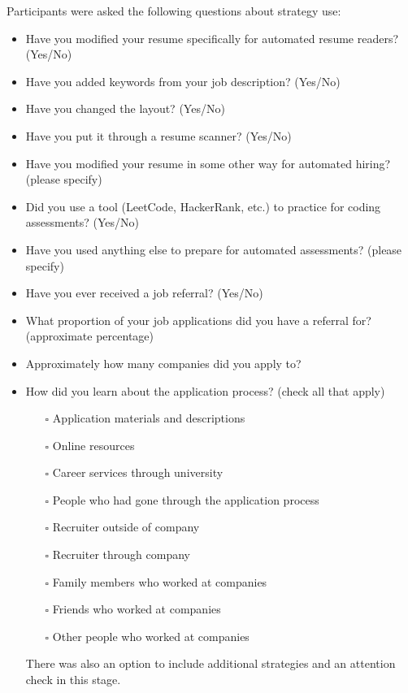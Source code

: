 Participants were asked the following questions about strategy use:
\begin{itemize}
\item Have you modified your resume specifically for automated resume readers? (Yes/No)
\item Have you added keywords from your job description? (Yes/No)
\item Have you changed the layout? (Yes/No)
\item Have you put it through a resume scanner? (Yes/No)
\item Have you modified your resume in some other way for automated hiring? (please specify)
\item Did you use a tool (LeetCode, HackerRank, etc.) to practice for coding assessments? (Yes/No)
\item Have you used anything else to prepare for automated assessments? (please specify)
\item Have you ever received a job referral? (Yes/No)
\item What proportion of your job applications did you have a referral for? (approximate percentage)
\item Approximately how many companies did you apply to? 
\item How did you learn about the application process? (check all that apply)
    \begin{itemize}
        \item[$\square$] Application materials and descriptions
        \item[$\square$] Online resources
        \item[$\square$] Career services through university 
        \item[$\square$] People who had gone through the application process
        \item[$\square$] Recruiter outside of company
        \item[$\square$] Recruiter through company
        \item[$\square$] Family members who worked at companies 
        \item[$\square$] Friends who worked at companies 
        \item[$\square$] Other people who worked at companies
    \end{itemize}
There was also an option to include additional strategies and an attention check in this stage.
\end{itemize}

